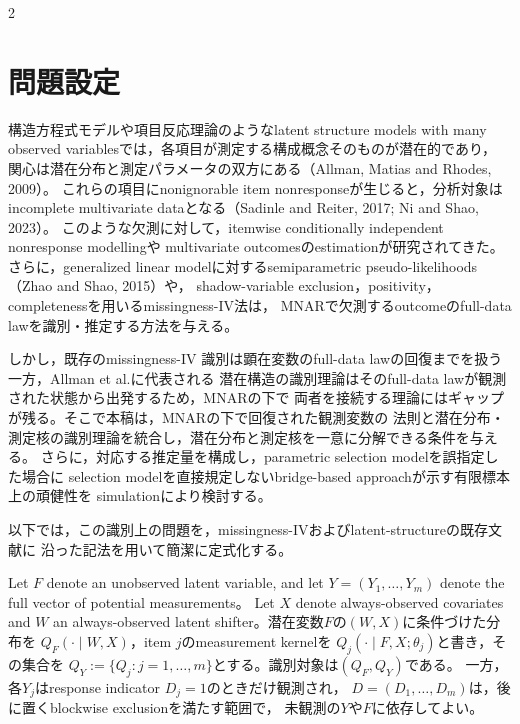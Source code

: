 \documentclass[a4paper,10pt]{article}
\begin{document}
\begin{multicols}{2}

\section{問題設定}
構造方程式モデルや項目反応理論のようなlatent structure models with many
observed variablesでは，各項目が測定する構成概念そのものが潜在的であり，
関心は潜在分布と測定パラメータの双方にある（Allman, Matias and Rhodes, 2009）。
これらの項目にnonignorable item nonresponseが生じると，分析対象は
incomplete multivariate dataとなる（Sadinle and Reiter, 2017; Ni and Shao, 2023）。
このような欠測に対して，itemwise conditionally independent nonresponse modellingや
multivariate outcomesのestimationが研究されてきた。さらに，generalized linear
modelに対するsemiparametric pseudo-likelihoods（Zhao and Shao, 2015）や，
shadow-variable exclusion，positivity，completenessを用いるmissingness-IV法は，
MNARで欠測するoutcomeのfull-data lawを識別・推定する方法を与える。

しかし，既存のmissingness-IV
識別は顕在変数のfull-data lawの回復までを扱う一方，Allman et al.に代表される
潜在構造の識別理論はそのfull-data lawが観測された状態から出発するため，MNARの下で
両者を接続する理論にはギャップが残る。そこで本稿は，MNARの下で回復された観測変数の
法則と潜在分布・測定核の識別理論を統合し，潜在分布と測定核を一意に分解できる条件を与える。
さらに，対応する推定量を構成し，parametric selection modelを誤指定した場合に
selection modelを直接規定しないbridge-based approachが示す有限標本上の頑健性を
simulationにより検討する。

以下では，この識別上の問題を，missingness-IVおよびlatent-structureの既存文献に
沿った記法を用いて簡潔に定式化する。

Let $F$ denote an unobserved latent variable, and let
$Y=(Y_1,\ldots,Y_m)$ denote the full vector of potential measurements。
Let $X$ denote always-observed covariates and $W$ an always-observed latent
shifter。潜在変数$F$の$(W,X)$に条件づけた分布を
$Q_F(\cdot\mid W,X)$，item $j$のmeasurement kernelを
$Q_j(\cdot\mid F,X;\theta_j)$と書き，その集合を
$Q_Y:=\{Q_j:j=1,\ldots,m\}$とする。識別対象は$(Q_F,Q_Y)$である。
一方，各$Y_j$はresponse indicator $D_j=1$のときだけ観測され，
$D=(D_1,\ldots,D_m)$は，後に置くblockwise exclusionを満たす範囲で，
未観測の$Y$や$F$に依存してよい。


\end{multicols}
\end{document}
